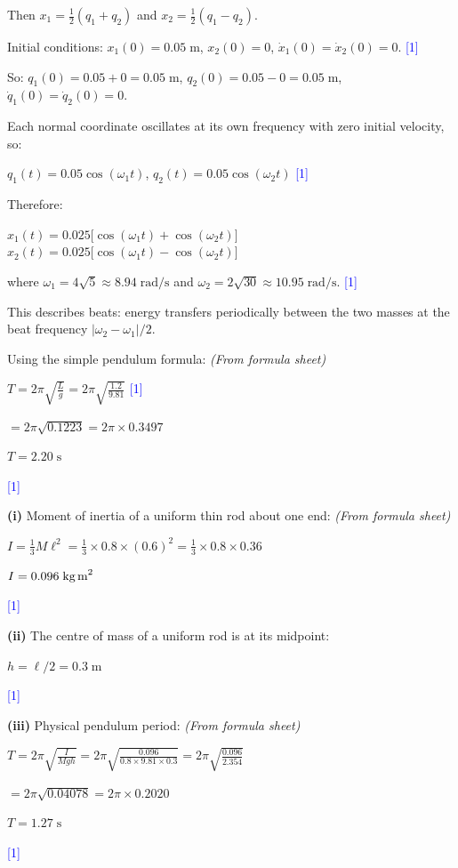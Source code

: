 \documentclass[12pt,a4paper]{article}
\newcommand{\markstep}[1]{\hfill\textcolor{blue}{[#1]}}
\newcommand{\finalanswer}[1]{%
  \begin{tcolorbox}[colback=green!5!white,colframe=green!50!black,boxrule=0.5pt]
  #1
  \end{tcolorbox}
}
\newcommand{\fromsheet}{\textit{(From formula sheet)}}
\begin{document}
\begin{parts}
Then $x_1 = \tfrac{1}{2}(q_1 + q_2)$ and $x_2 = \tfrac{1}{2}(q_1 - q_2)$.

Initial conditions: $x_1(0) = 0.05\;\text{m}$, $x_2(0) = 0$, $\dot{x}_1(0) = \dot{x}_2(0) = 0$. \markstep{1}

So: $q_1(0) = 0.05 + 0 = 0.05\;\text{m}$, $q_2(0) = 0.05 - 0 = 0.05\;\text{m}$, $\dot{q}_1(0) = \dot{q}_2(0) = 0$.

Each normal coordinate oscillates at its own frequency with zero initial velocity, so:

$q_1(t) = 0.05\cos(\omega_1 t)$, \quad $q_2(t) = 0.05\cos(\omega_2 t)$ \markstep{1}

Therefore:

\finalanswer{%
$x_1(t) = 0.025\bigl[\cos(\omega_1 t) + \cos(\omega_2 t)\bigr]$\\[4pt]
$x_2(t) = 0.025\bigl[\cos(\omega_1 t) - \cos(\omega_2 t)\bigr]$
}

where $\omega_1 = 4\sqrt{5} \approx 8.94\;\text{rad/s}$ and $\omega_2 = 2\sqrt{30} \approx 10.95\;\text{rad/s}$. \markstep{1}

This describes beats: energy transfers periodically between the two masses at the beat frequency $|\omega_2 - \omega_1|/2$.

\item Using the simple pendulum formula: \fromsheet

$T = 2\pi\sqrt{\frac{L}{g}} = 2\pi\sqrt{\frac{1.2}{9.81}}$ \markstep{1}

$= 2\pi\sqrt{0.1223} = 2\pi \times 0.3497$

\finalanswer{$T = 2.20\;\text{s}$} \markstep{1}

\item \textbf{(i)} Moment of inertia of a uniform thin rod about one end: \fromsheet

$I = \frac{1}{3}M\ell^2 = \frac{1}{3}\times 0.8 \times (0.6)^2 = \frac{1}{3}\times 0.8 \times 0.36$

\finalanswer{$I = 0.096\;\text{kg\,m}^2$} \markstep{1}

\textbf{(ii)} The centre of mass of a uniform rod is at its midpoint:

\finalanswer{$h = \ell/2 = 0.3\;\text{m}$} \markstep{1}

\textbf{(iii)} Physical pendulum period: \fromsheet

$T = 2\pi\sqrt{\frac{I}{Mgh}} = 2\pi\sqrt{\frac{0.096}{0.8\times 9.81\times 0.3}} = 2\pi\sqrt{\frac{0.096}{2.354}}$

$= 2\pi\sqrt{0.04078} = 2\pi\times 0.2020$

\finalanswer{$T = 1.27\;\text{s}$} \markstep{1}

\end{parts}
\end{document}
